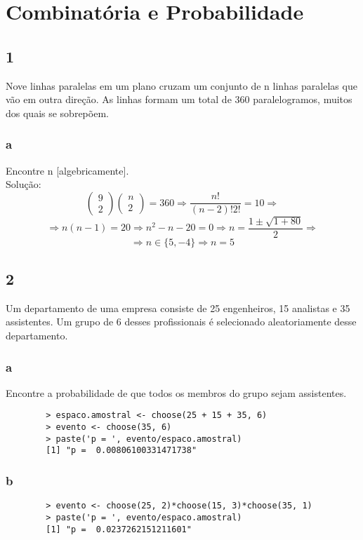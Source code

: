 \documentclass{article}[twocolumn]
\begin{document}
	\section{Combinatória e Probabilidade}
	\subsection{1}
	Nove linhas paralelas em um plano cruzam um conjunto de n linhas paralelas que vão
	em outra direção. As linhas formam um total de 360 paralelogramos, muitos dos quais se
	sobrepõem.
	\subsubsection{a}
	Encontre n [algebricamente].\\
	Solução:
	\begin{equation}
		\left(\begin{array}{c}
			9\\2
		\end{array}\right)
		\left(\begin{array}{c}
		    n\\2
		\end{array}\right)
		= 360 \Rightarrow
		\frac{n!}{(n - 2)!2!} = 10 \Rightarrow
	\end{equation}
	\begin{equation}
		\Rightarrow
		n(n - 1) = 20 \Rightarrow
		n^{2} - n - 20 = 0\Rightarrow
		n = \frac{1 \pm \sqrt{1 + 80}}{2}\Rightarrow
	\end{equation}
	\begin{equation}
		\Rightarrow
		n \in \{5, -4\} \Rightarrow
		n = 5
	\end{equation}
	\subsection{2}
	Um departamento de uma empresa consiste de 25 engenheiros, 15 analistas e 35
	assistentes. Um grupo de 6 desses profissionais é selecionado aleatoriamente desse
	departamento.
	\subsubsection{a}
	Encontre a probabilidade de que todos os membros do grupo sejam assistentes.
	\begin{verbatim}
		> espaco.amostral <- choose(25 + 15 + 35, 6)
		> evento <- choose(35, 6)
		> paste('p = ', evento/espaco.amostral)
		[1] "p =  0.00806100331471738"
	\end{verbatim}
	\subsubsection{b}
	\begin{verbatim}
		> evento <- choose(25, 2)*choose(15, 3)*choose(35, 1)
		> paste('p = ', evento/espaco.amostral)
		[1] "p =  0.0237262151211601"
	\end{verbatim}
\end{document}
